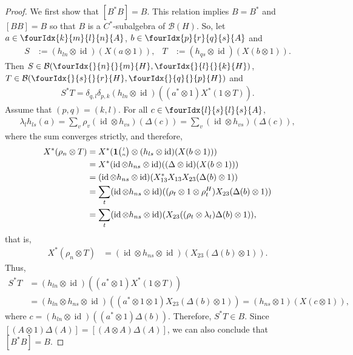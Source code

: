 \documentclass[11pt]{article}
\DeclareMathOperator{\id}{id}
\newcommand{\Grt}[3]{#1{\tiny {\begin{pmatrix} #2\\#3\end{pmatrix}}}}
\newcommand{\UnitC}[2]{\Grt{\mathbf{1}}{#1}{#2}}
\newcommand{\Gr}[5]{\fourIdx{#2}{#4}{#3}{#5}{#1}}%
\newcommand{\Grd}[3]{\Gr{#1}{}{}{#2}{#3}}
\theoremstyle{definition}
\numberwithin{equation}{section}
\begin{document}
  \begin{proof}
We first show that $[B^{*}B]= B$. This relation implies $B=B^{*}$ and
$[BB]=B$ so that $B$ is a $C^{*}$-subalgebra of $\mathcal{B}(H)$. So,
    let $a\in \Gr{A}{k}{l}{m}{n}$, $b\in \Gr{A}{p}{q}{r}{s}$ and
 \begin{align*}
   S&:=(h_{ln} \otimes \id)(X(a\otimes 1)), &
   T&:=(h_{qs} \otimes \id)(X(b\otimes 1)).
 \end{align*}
Then  $S \in \mathcal{B}(\Grd{H}{n}{m},\Grd{H}{l}{k})$, $T\in
\mathcal{B}(\Grd{H}{s}{r},\Grd{H}{q}{p})$ and
\begin{align*}
  S^{*}T = \delta_{q,l}\delta_{p,k} (h_{ln} \otimes \id)((a^{*}\otimes
  1)X^{*}(1\otimes T)).
\end{align*}
Assume that $(p,q)=(k,l)$.  For all $c\in \Gr{A}{l}{l}{s}{s}$,
\begin{align*}
  \lambda_{l} h_{ls}(a) = \sum_{v} \rho_{v}(\id \otimes
  h_{vs})(\Delta(c))
= \sum_{v} (\id \otimes h_{vs})(\Delta(c)),
\end{align*}
where the sum converges strictly, and therefore,
\begin{align*}
 X^{*}(\rho_{n}\otimes T) &=  X^{*}(\UnitC{l}{n} \otimes (h_{ls} \otimes
  \id)(X(b\otimes 1))) \\
  &=  X^{*}(\id \otimes h_{ns}\otimes
  \id)((\Delta\otimes \id)(X(b\otimes 1))) \\
  &=    (\id \otimes h_{ns}\otimes
  \id)(X^{*}_{13}X_{13}X_{23}(\Delta(b)\otimes 1)) \\
  &= \sum_{t}(\id \otimes h_{ns} \otimes
  \id)((\rho_{t} \otimes 1\otimes \rho^{H}_{t})X_{23}(\Delta(b)\otimes
  1)) \\
&= \sum_{t}(\id \otimes h_{ns} \otimes
  \id)(X_{23}((\rho_{t}\otimes \lambda_{t})\Delta(b)\otimes
  1)), 
\end{align*}
that is,
\begin{align}\label{eq:corep-complemented}
  X^{*}(\rho_{n}\otimes T) &=
 (\id \otimes h_{ns} \otimes
  \id)(X_{23}(\Delta(b)\otimes 1)).
\end{align}
Thus,
\begin{align*}
  S^{*}T &= (h_{ln} \otimes \id)((a^{*}\otimes
  1)X^{*}(1\otimes T))  \\ &= (h_{ln} \otimes h_{ns} \otimes
  \id)((a^{*} \otimes 1\otimes 1)X_{23}(\Delta(b) \otimes 1)) 
  =(h_{ns} \otimes 1)(X(c\otimes 1)), 
\end{align*}
where $c=(h_{ln} \otimes \id)((a^{*}\otimes 1)\Delta(b))$. Therefore,
$S^{*}T \in B$. Since $[(A\otimes 1)\Delta(A)]=[(A\otimes
A)\Delta(A)]$, we can also conclude that $[B^{*}B]=B$.



\end{proof}
\end{document}
